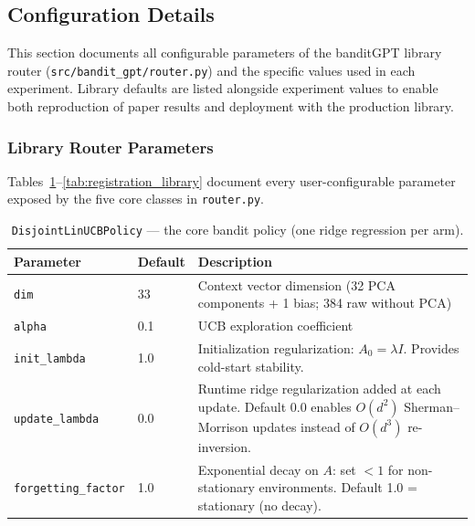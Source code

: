 
\subsection{Configuration Details}
\label{app:config}

This section documents all configurable parameters of the banditGPT library router
(\texttt{src/bandit\_gpt/router.py}) and the specific values used in each experiment.
Library defaults are listed alongside experiment values to enable both reproduction
of paper results and deployment with the production library.


\subsubsection{Library Router Parameters}

Tables~\ref{tab:linucb_library}--\ref{tab:registration_library} document every
user-configurable parameter exposed by the five core classes in \texttt{router.py}.


\begin{table}[h]
\centering
\caption{\texttt{DisjointLinUCBPolicy} --- the core bandit policy (one ridge regression per arm).}
\label{tab:linucb_library}
\small
\begin{tabular}{@{}llp{6.8cm}@{}}
\toprule
\textbf{Parameter} & \textbf{Default} & \textbf{Description} \\
\midrule
\texttt{dim} & 33 & Context vector dimension (32 PCA components + 1 bias; 384 raw without PCA) \\
\texttt{alpha} & 0.1 & UCB exploration coefficient \\
\texttt{init\_lambda} & 1.0 & Initialization regularization: $A_0 = \lambda I$. Provides cold-start stability. \\
\texttt{update\_lambda} & 0.0 & Runtime ridge regularization added at each update. Default 0.0 enables $O(d^2)$ Sherman--Morrison updates instead of $O(d^3)$ re-inversion. \\
\texttt{forgetting\_factor} & 1.0 & Exponential decay on $A$: set $<1$ for non-stationary environments. Default 1.0 = stationary (no decay). \\
\bottomrule
\end{tabular}
\end{table}

